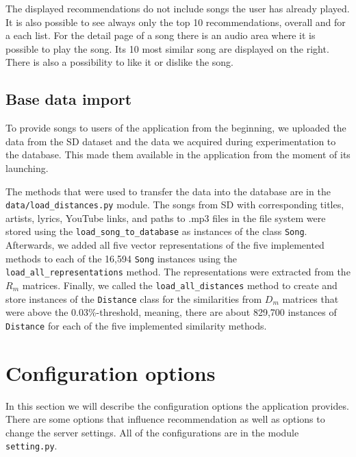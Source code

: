 The displayed recommendations do not include songs the user has already played. It is also possible to see always only the top 10 recommendations, overall and for a each list. For the detail page of a song there is an audio area where it is possible to play the song. Its 10 most similar song are displayed on the right. There is also a possibility to like it or dislike the song.  

\subsection{Base data import}

To provide songs to users of the application from the beginning, we uploaded the data from the SD dataset and the data we acquired during experimentation to the database. This made them available in the application from the moment of its launching. 

The methods that were used to transfer the data into the database are in the \texttt{data/load\_distances.py} module. The songs from SD with corresponding titles, artists, lyrics, YouTube links, and paths to .mp3 files in the file system were stored using the \texttt{load\_song\_to\_database} as instances of the class \texttt{Song}. Afterwards, we added all five vector representations of the five implemented methods to each of the 16,594 \texttt{Song} instances using the \texttt{load\_all\_representations} method. The representations were extracted from the $R_m$ matrices. Finally, we called the \texttt{load\_all\_distances} method to create and store instances of the \texttt{Distance} class for the similarities from $D_m$ matrices that were above the 0.03\%-threshold, meaning, there are about 829,700 instances of \texttt{Distance} for each of the five implemented similarity methods.

\section{Configuration options}\label{sec:configurations}

In this section we will describe the configuration options the application provides. There are some options that influence recommendation as well as options to change the server settings. All of the configurations are in the module \texttt{setting.py}.


